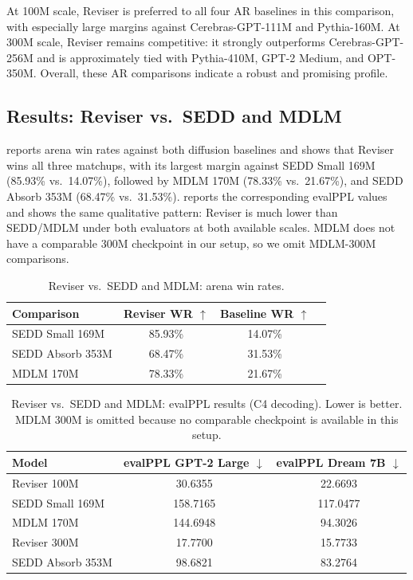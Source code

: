 \documentclass[11pt]{article}
\begin{document}
At 100M scale, Reviser is preferred to all four AR baselines in this comparison, with especially large margins against Cerebras-GPT-111M and Pythia-160M. At 300M scale, Reviser remains competitive: it strongly outperforms Cerebras-GPT-256M and is approximately tied with Pythia-410M, GPT-2 Medium, and OPT-350M. Overall, these AR comparisons indicate a robust and promising profile.

\subsection{Results: Reviser vs.\ SEDD and MDLM}
\label{sec:results}

 reports arena win rates against both diffusion baselines and shows that Reviser wins all three matchups, with its largest margin against SEDD Small 169M (\num{85.93}\% vs.\ \num{14.07}\%), followed by MDLM 170M (\num{78.33}\% vs.\ \num{21.67}\%), and SEDD Absorb 353M (\num{68.47}\% vs.\ \num{31.53}\%).  reports the corresponding evalPPL values and shows the same qualitative pattern: Reviser is much lower than SEDD/MDLM under both evaluators at both available scales. MDLM does not have a comparable 300M checkpoint in our setup, so we omit MDLM-300M comparisons.

\begin{table}[tbp]
\centering
\small
\setlength{\tabcolsep}{5pt}
\begin{tabular}{lccc}
\toprule
Comparison & Reviser WR $\uparrow$ & Baseline WR $\uparrow$ \\
\midrule
SEDD Small 169M  & \num{85.93}\% & \num{14.07}\% \\
SEDD Absorb 353M & \num{68.47}\% & \num{31.53}\% \\
MDLM 170M        & \num{78.33}\% & \num{21.67}\% \\
\bottomrule
\end{tabular}
\caption{Reviser vs.\ SEDD and MDLM: arena win rates.}
\label{tab:arena_vs_diffusion}
\end{table}

\begin{table}[tbp]
\centering
\small
\setlength{\tabcolsep}{7pt}
\begin{tabular}{lcc}
\toprule
Model & evalPPL GPT-2 Large $\downarrow$ & evalPPL Dream 7B $\downarrow$ \\
\midrule
Reviser 100M & \num{30.6355} & \num{22.6693} \\
SEDD Small 169M & \num{158.7165} & \num{117.0477} \\
MDLM 170M & \num{144.6948} & \num{94.3026} \\
\midrule
Reviser 300M & \num{17.7700} & \num{15.7733} \\
SEDD Absorb 353M & \num{98.6821} & \num{83.2764} \\
\bottomrule
\end{tabular}
\caption{Reviser vs.\ SEDD and MDLM: evalPPL results (C4 decoding). Lower is better. MDLM 300M is omitted because no comparable checkpoint is available in this setup.}
\label{tab:evalppl_vs_diffusion}
\end{table}
\end{document}
